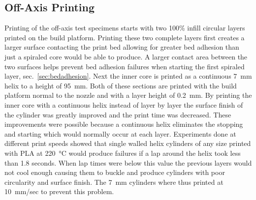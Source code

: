 \documentclass[main.tex]{subfiles}
\begin{document}
\subsection{Off-Axis Printing}
Printing of the off-axis test specimens starts with two 100\% infill circular layers printed on the build platform.
Printing these two complete layers first creates a larger surface contacting the print bed allowing for greater bed adhesion than just a spiraled core would be able to produce.
A larger contact area between the two surfaces helps prevent bed adhesion failures when starting the first spiraled layer, sec.~\ref{sec:bedadhesion}.
Next the inner core is printed as a continuous \SI{7}{mm} helix to a height of \SI{95}{mm}.
Both of these sections are printed with the build platform normal to the nozzle and with a layer height of \SI{0.2}{mm}.
By printing the inner core with a continuous helix instead of layer by layer the surface finish of the cylinder was greatly improved and the print time was decreased.
These improvements were possible because a continuous helix eliminates the stopping and starting which would normally occur at each layer.
Experiments done at different print speeds showed that single walled helix cylinders of any size printed with PLA at \SI{220}{\degreeCelsius} would produce failures if a lap around the helix took less than 1.8 seconds.
When lap times were below this value the previous layers would not cool enough causing them to buckle and produce cylinders with poor circularity and surface finish.
The \SI{7}{mm} cylinders where thus printed at \SI{10}{mm/sec} to prevent this problem.
\end{document}
